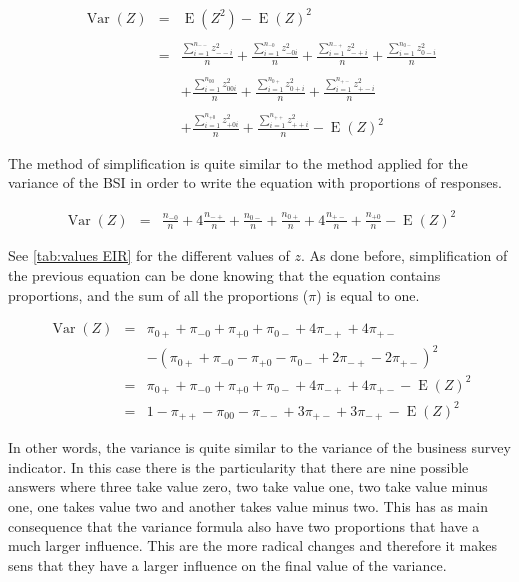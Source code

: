 \documentclass[12pt,a4paper,oneside]{book}
\DeclareMathOperator{\Var}{Var}
\DeclareMathOperator{\E}{E}
\begin{document}
\begin{eqnarray}
\Var(Z) &=&  
	\E \left( Z^2\right) - \E \left( Z\right)^2 \nonumber \\ \nonumber \\
	&=&  \frac{ \sum_{i=1}^{n_{--}} z^2_{--i}}{n} 
     +  \frac{\sum_{i=1}^{n_{-0}} z^2_{-0i} }{n} 
    +  \frac{\sum_{i=1}^{n_{-+}} z^2_{-+i}}{n} 
    +  \frac{\sum_{i=1}^{n_{0-}} z^2_{0-i} }{n} \nonumber  \\ \nonumber  \\
    && +  \frac{\sum_{i=1}^{n_{00}} z^2_{00i} }{n}  
      +  \frac{\sum_{i=1}^{n_{0+}} z^2_{0+i}}{n} 
    +  \frac{\sum_{i=1}^{n_{+-}} z^2_{+-i} }{n}  \nonumber \\ \nonumber  \\
    && +  \frac{\sum_{i=1}^{n_{+0}} z^2_{+0i} }{n} 
    +  \frac{\sum_{i=1}^{n_{++}} z^2_{++i}}{n}   
     - \E(Z)^2 
\end{eqnarray}

The method of simplification is quite similar to the method applied for the variance of the BSI in order to write the equation with proportions of responses.

\begin{eqnarray}
    \Var(Z) &=& \frac{n_{-0}}{n} + 4  \frac{n_{-+}}{n} +  \frac{n_{0-}}{n} + \frac{n_{0+}}{n} + 4  \frac{n_{+-}}{n} +  \frac{n_{+0}}{n} - \E(Z)^2 
\end{eqnarray}{}

See \autoref{tab:values EIR} for the different values of $z$. As done before, simplification of the previous equation can be done knowing that the equation contains proportions, and the sum of all the proportions ($\pi$) is equal to one.


\begin{eqnarray}
\Var(Z) &=& \pi_{0+} + \pi_{-0} + \pi_{+0} + \pi_{0-} +4\pi_{-+} +4\pi_{+-} \nonumber \\ 
&&    - (\pi_{0+} + \pi_{-0} - \pi_{+0} - \pi_{0-} +2\pi_{-+} -2\pi_{+-})^2  \\
&=& \pi_{0+} + \pi_{-0} + \pi_{+0} + \pi_{0-} +4\pi_{-+} +4\pi_{+-} - \E(Z)^2  \\
&=& 1 - \pi_{++} - \pi_{00} - \pi_{--} + 3\pi_{+-} + 3\pi_{-+} - \E(Z)^2
\end{eqnarray}

In other words, the variance is quite similar to the variance of the business survey indicator. In this case there is the particularity that there are nine possible answers where three take value zero, two take value one, two take value minus one, one takes value two and another takes value minus two. 
This has as main consequence that the variance formula also have two proportions that have a much larger influence. This are the more radical changes and therefore it makes sens that they have a larger influence on the final value of the variance.
\end{document}
